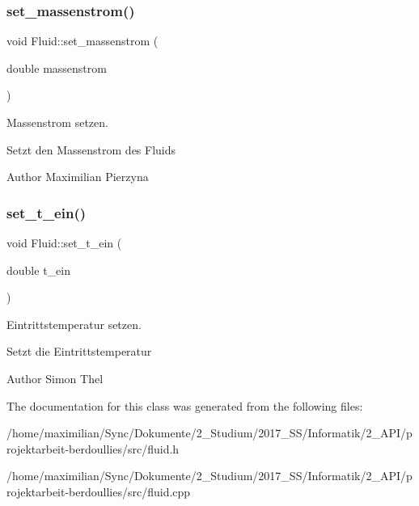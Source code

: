 \subsubsection{\texorpdfstring{set\+\_\+massenstrom()}{set\_massenstrom()}}
{\footnotesize\ttfamily void Fluid\+::set\+\_\+massenstrom (\begin{DoxyParamCaption}\item[{double}]{massenstrom }\end{DoxyParamCaption})}



Massenstrom setzen. 

Setzt den Massenstrom des Fluids \begin{DoxyAuthor}{Author}
Maximilian Pierzyna 
\end{DoxyAuthor}
\mbox{\label{class_fluid_a9449846d8fd4bf31d8685eefa55d4a57}} 
\subsubsection{\texorpdfstring{set\+\_\+t\+\_\+ein()}{set\_t\_ein()}}
{\footnotesize\ttfamily void Fluid\+::set\+\_\+t\+\_\+ein (\begin{DoxyParamCaption}\item[{double}]{t\+\_\+ein }\end{DoxyParamCaption})}



Eintrittstemperatur setzen. 

Setzt die Eintrittstemperatur \begin{DoxyAuthor}{Author}
Simon Thel 
\end{DoxyAuthor}


The documentation for this class was generated from the following files\+:\begin{DoxyCompactItemize}
\item 
/home/maximilian/\+Sync/\+Dokumente/2\+\_\+\+Studium/2017\+\_\+\+S\+S/\+Informatik/2\+\_\+\+A\+P\+I/projektarbeit-\/berdoullies/src/fluid.\+h\item 
/home/maximilian/\+Sync/\+Dokumente/2\+\_\+\+Studium/2017\+\_\+\+S\+S/\+Informatik/2\+\_\+\+A\+P\+I/projektarbeit-\/berdoullies/src/fluid.\+cpp\end{DoxyCompactItemize}
